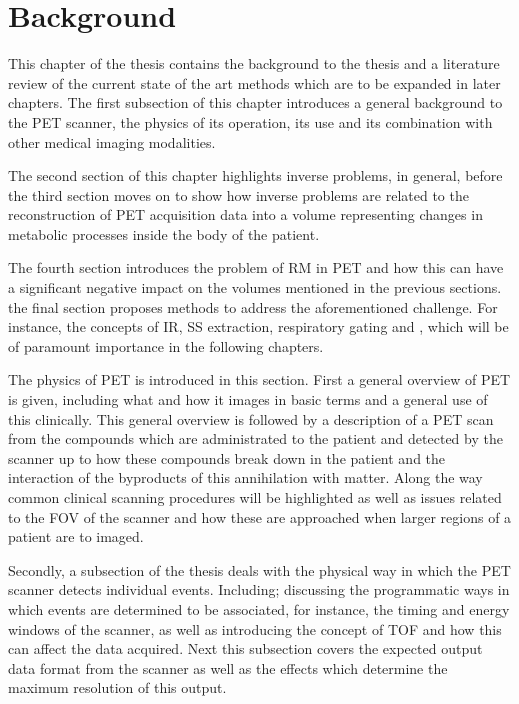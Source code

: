 \chapter{Background} \label{sec:background}
    \newpage
    
        This chapter of the thesis contains the background to the thesis and a literature review of the current state of the art methods which are to be expanded in later chapters. The first subsection of this chapter introduces a general background to the \gls{PET} scanner, the physics of its operation, its use and its combination with other medical imaging modalities.
        
        The second section of this chapter highlights inverse problems, in general, before the third section moves on to show how inverse problems are related to the reconstruction of \gls{PET} acquisition data into a volume representing changes in metabolic processes inside the body of the patient.
        
        The fourth section introduces the problem of \gls{RM} in \gls{PET} and how this can have a significant negative impact on the volumes mentioned in the previous sections. the final section proposes methods to address the aforementioned challenge. For instance, the concepts of \gls{IR}, \gls{SS} extraction, respiratory gating and , which will be of paramount importance in the following chapters.
    
        The physics of \gls{PET} is introduced in this section. First a general overview of \gls{PET} is given, including what and how it images in basic terms and a general use of this clinically. This general overview is followed by a description of a \gls{PET} scan from the compounds which are administrated to the patient and detected by the scanner up to how these compounds break down in the patient and the interaction of the byproducts of this annihilation with matter. Along the way common clinical scanning procedures will be highlighted as well as issues related to the \gls{FOV} of the scanner and how these are approached when larger regions of a patient are to imaged.
            
        Secondly, a subsection of the thesis deals with the physical way in which the \gls{PET} scanner detects individual events. Including; discussing the programmatic ways in which events are determined to be associated, for instance, the timing and energy windows of the scanner, as well as introducing the concept of \gls{TOF} and how this can affect the data acquired. Next this subsection covers the expected output data format from the scanner as well as the effects which determine the maximum resolution of this output.
        
